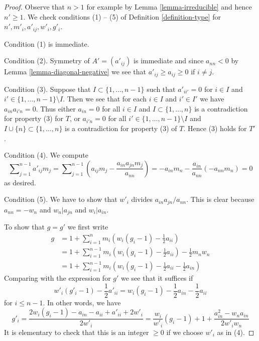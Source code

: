 \documentclass{stacks-project}
\theoremstyle{plain}
\theoremstyle{definition}
\theoremstyle{remark}
\numberwithin{equation}{subsection}
\begin{document}
\begin{proof}
Observe that $n > 1$ for example by Lemma \ref{lemma-irreducible}
and hence $n' \geq 1$. We check conditions (1) -- (5) of
Definition \ref{definition-type} for $n', m'_i, a'_{ij}, w'_i, g'_i$.

\medskip\noindent
Condition (1) is immediate.

\medskip\noindent
Condition (2). Symmetry of $A' = (a'_{ij})$ is immediate
and since $a_{nn} < 0$ by Lemma \ref{lemma-diagonal-negative}
we see that $a'_{ij} \geq a_{ij} \geq 0$ if $i \not = j$.

\medskip\noindent
Condition (3). Suppose that $I \subset \{1, \ldots, n - 1\}$ such that
$a'_{ii'} = 0$ for $i \in I$ and $i' \in \{1, \ldots, n - 1\} \setminus I$.
Then we see that for each $i \in I$ and $i' \in I'$ we have
$a_{in}a_{i'n} = 0$. Thus either $a_{in} = 0$ for all $i \in I$ and
$I \subset \{1, \ldots, n\}$ is a contradiction for property (3) for $T$,
or $a_{i'n} = 0$ for all $i' \in \{1, \ldots, n - 1\} \setminus I$
and $I \cup \{n\} \subset \{1, \ldots, n\}$ is a contradiction for
property (3) of $T$. Hence (3) holds for $T'$.

\medskip\noindent
Condition (4). We compute
$$
\sum\nolimits_{j = 1}^{n - 1} a'_{ij}m_j =
\sum\nolimits_{j = 1}^{n - 1}
(a_{ij}m_j - \frac{a_{in}a_{jn}m_j}{a_{nn}}) =
- a_{in}m_n - \frac{a_{in}}{a_{nn}}(-a_{nn}m_n) = 0
$$
as desired.

\medskip\noindent
Condition (5). We have to show that $w'_i$ divides $a_{in}a_{jn}/a_{nn}$.
This is clear because $a_{nn} = -w_n$ and $w_n | a_{jn}$ and $w_i | a_{in}$.

\medskip\noindent
To show that $g = g'$ we first write
\begin{align*}
g
& =
1 + \sum\nolimits_{i = 1}^n m_i(w_i(g_i - 1) - \frac{1}{2}a_{ii}) \\
& =
1 + \sum\nolimits_{i = 1}^{n - 1} m_i(w_i(g_i - 1) - \frac{1}{2}a_{ii})
-\frac{1}{2}m_nw_n \\
& =
1 +  \sum\nolimits_{i = 1}^{n - 1}
m_i(w_i(g_i - 1) - \frac{1}{2}a_{ii} - \frac{1}{2}a_{in})
\end{align*}
Comparing with the expression for $g'$ we see that it suffices if
$$
w'_i(g'_i - 1) - \frac{1}{2}a'_{ii} =
w_i(g_i - 1) - \frac{1}{2}a_{in} - \frac{1}{2}a_{ii}
$$
for $i \leq n - 1$. In other words, we have
$$
g'_i = \frac{2w_i(g_i - 1) - a_{in} - a_{ii} + a'_{ii} + 2w'_i}{2w'_i} =
\frac{w_i}{w'_i}(g_i - 1) + 1 + \frac{a_{in}^2 - w_na_{in}}{2w'_iw_n}
$$
It is elementary to check that this is an integer $\geq 0$
if we choose $w'_i$ as in (4).
\end{proof}
\end{document}
